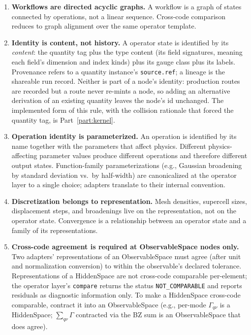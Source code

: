 \documentclass[11pt,a4paper]{article}
\begin{document}
\begin{enumerate}[leftmargin=2.5em, itemsep=0.4em]
  \item \textbf{Workflows are directed acyclic graphs.} A workflow is a graph of states
        connected by operations, not a linear sequence. Cross-code comparison reduces
        to graph alignment over the same operator template.

  \item \textbf{Identity is content, not history.} A operator state is identified by its
        \emph{content}: the quantity tag plus the type content (its field
        signatures, meaning each field's dimension and index kinds) plus its
        gauge class plus its labels. Provenance refers to a quantity instance's
        \texttt{source.ref}; a lineage is the shareable run record. Neither is part
        of a node's identity: production routes are recorded but a route never re-mints
        a node, so adding an alternative derivation of an existing quantity leaves
        the node's id unchanged. The implemented form of this rule, with the
        collision rationale that forced the quantity tag, is Part~\ref{part:kernel}.

  \item \textbf{Operation identity is parameterized.} An operation is identified by its
        name together with the parameters that affect physics. Different physics-affecting
        parameter values produce different operations and therefore different output
        states. Function-family parameterizations (e.g., Gaussian broadening by standard
        deviation vs.\ by half-width) are canonicalized at the operator layer to a single
        choice; adapters translate to their internal convention.

  \item \textbf{Discretization belongs to representation.} Mesh densities, supercell
        sizes, displacement steps, and broadenings live on the representation, not on
        the operator state. Convergence is a relationship between an operator state and
        a family of its representations.

  \item \textbf{Cross-code agreement is required at ObservableSpace nodes only.} Two
        adapters' representations of an ObservableSpace must agree (after unit and
        normalization conversion) to within the observable's declared tolerance.
        Representations of a HiddenSpace are not cross-code comparable per-element;
        the operator layer's \texttt{compare} returns the status \texttt{NOT\_COMPARABLE}
        and reports residuals as diagnostic information only. To make a HiddenSpace
        cross-code comparable, contract it into an ObservableSpace (e.g., per-mode
        $\Gamma_{q\nu}$ is a HiddenSpace; $\sum_{q\nu}\Gamma$ contracted via the
        BZ sum is an ObservableSpace that does agree).


\end{enumerate}
\end{document}
